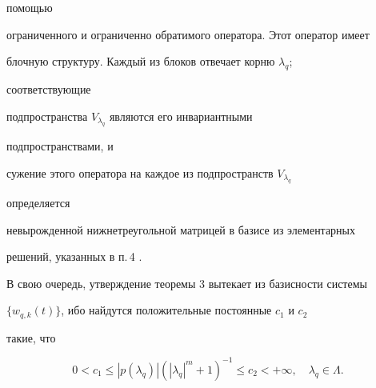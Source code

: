 помощью 


ограниченного и ограниченно обратимого оператора. Этот оператор имеет 


блочную структуру. Каждый из блоков отвечает корню $\lambda_q$; 


соответствующие 


подпространства $V_{\lambda_q}$ являются его инвариантными 


подпространствами, и 


сужение этого оператора на каждое из подпространств $V_{\lambda_q}$ 


определяется 


невырожденной нижнетреугольной матрицей в базисе из элементарных 


решений, указанных в п.\,4 \cite{9}. 


 


В свою очередь, утверждение теоремы 3 вытекает из базисности системы 


$\{w_{q,k}(t)\}$, ибо найдутся положительные постоянные $c_1$ и $c_2$ 


такие, что 


$$ 


0<c_1\le|p(\lambda_q)|(|\lambda_q|^m+1)^{-1}\le c_2 


<+\infty,\quad \lambda_q\in\Lambda. 


$$ 


 


 


